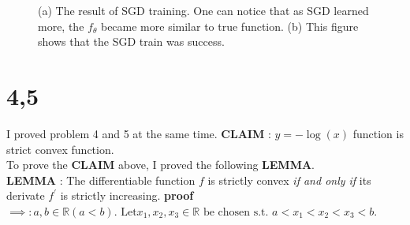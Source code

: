 \documentclass[10pt]{article}
\begin{document}
\begin{figure}[!h]
    \begin{center}
    \end{center}
    \label{fig4}
    \caption{(a) The result of SGD training. One can notice that as SGD learned more, the $f_\theta$ became more similar to true function. (b) This figure shows that the SGD train was success. }
\end{figure}

\clearpage
\section*{4,5}
I proved problem 4 and 5 at the same time. 
\textbf{CLAIM} : $y = -\log(x)$ function is strict convex function. 
\\To prove the \textbf{CLAIM} above, I proved the following \textbf{LEMMA}.\\
\textbf{LEMMA} : The differentiable function $f$ is strictly convex \textit{if and only if} its derivate $f^\prime$ is strictly increasing.
\textbf{proof}\\
$\implies :     a,b \in \mathbb{R} (a<b). \text{ Let} x_1, x_2, x_3 \in \mathbb{R} \text{ be chosen s.t. } a<x_1<x_2<x_3<b.$
\end{document}
